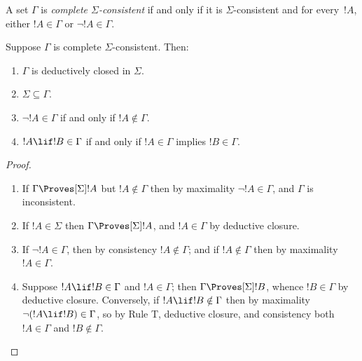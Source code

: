 \documentclass[../../../include/open-logic-section]{subfiles}
\begin{document}


\begin{defn}
  A set $\Gamma$ is \emph{complete $\Sigma$-consistent} if and
  only if it is $\Sigma$-consistent and for every~$!A$, either
  $!A \in \Gamma$ or $\lnot !A \in \Gamma$.
\end{defn}

\begin{prop}
  Suppose $\Gamma$ is complete $\Sigma$-consistent. Then:
  \begin{enumerate}
  \item $\Gamma$ is deductively closed in $\Sigma$.
  \item {}%
    $\Sigma \subseteq \Gamma$.
  \item {}%
    $\lnot!A \in \Gamma$ if and only if $!A \notin
    \Gamma$.
  \item {}%
    $!A \lif !B \in \Gamma$ if and only if $!A \in
    \Gamma$ implies $!B \in \Gamma$.
  \end{enumerate}
\end{prop}

\begin{proof}
  \begin{enumerate}
  \item If $\Gamma \Proves[\Sigma] !A$ but $!A \notin \Gamma$ then by
    maximality $\lnot!A \in \Gamma$, and $\Gamma$ is inconsistent.
  \item If $!A \in \Sigma$ then $\Gamma \Proves[\Sigma] !A$, and $!A
    \in \Gamma$ by deductive closure.
  \item If $\lnot!A \in \Gamma$, then by consistency $!A \notin
    \Gamma$; and if $!A \notin \Gamma$ then by maximality $!A \in
    \Gamma$.
  \item Suppose $!A \lif !B \in \Gamma$ and $!A \in \Gamma$; then
    $\Gamma \Proves[\Sigma] !B$, whence $!B \in \Gamma$ by deductive
    closure. Conversely, if $!A \lif !B \notin \Gamma$ then by
    maximality $\lnot (!A \lif !B) \in \Gamma$, so by Rule T,
    deductive closure, and consistency both $!A \in \Gamma$ and $!B
    \notin \Gamma$.
  \end{enumerate}
\end{proof}
\end{document}
